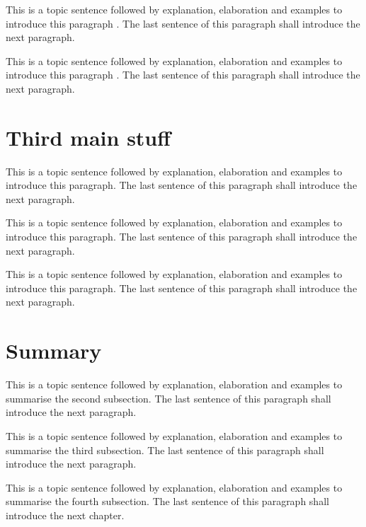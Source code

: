 This is a topic sentence followed by explanation, elaboration and examples to introduce this paragraph \citep{Stewart2016}. The last sentence of this paragraph shall introduce the next paragraph. \lipsum[1]

This is a topic sentence followed by explanation, elaboration and examples to introduce this paragraph \citep{Gallagher2016}. The last sentence of this paragraph shall introduce the next paragraph. \lipsum[1]

\section{Third main stuff}
\label{sec:ch_4_thirdmain}


This is a topic sentence followed by explanation, elaboration and examples to introduce this paragraph. The last sentence of this paragraph shall introduce the next paragraph. \lipsum[1]

This is a topic sentence followed by explanation, elaboration and examples to introduce this paragraph. The last sentence of this paragraph shall introduce the next paragraph. \lipsum[1]

This is a topic sentence followed by explanation, elaboration and examples to introduce this paragraph. The last sentence of this paragraph shall introduce the next paragraph. \lipsum[1]

\section{Summary}
\label{sec:ch_4_summary}


This is a topic sentence followed by explanation, elaboration and examples to summarise the second subsection. The last sentence of this paragraph shall introduce the next paragraph. \lipsum[1]

This is a topic sentence followed by explanation, elaboration and examples to summarise the third subsection. The last sentence of this paragraph shall introduce the next paragraph. \lipsum[1]

This is a topic sentence followed by explanation, elaboration and examples to summarise the fourth subsection. The last sentence of this paragraph shall introduce the next chapter. \lipsum[1]







